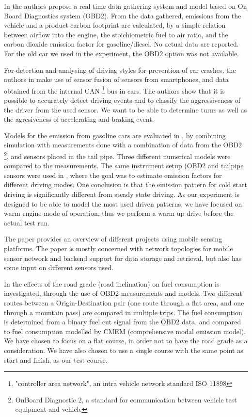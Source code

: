 \documentclass[conference]{IEEEtran}
\begin{document}
In \cite{hilpert201} the authors propose a real time data gathering system and model based on On Board Diagnostics system (OBD2). From the data gathered, emissions from the vehicle and a product carbon footprint are calculated, by a simple relation between airflow into the engine, the stoichiometric fuel to air ratio, and the carbon dioxide emission factor for gasoline/diesel. No actual data are reported. For the old car we used in the experiment, the OBD2 option was not available. 

For detection and analysing of driving styles for prevention of car crashes, the authors in \cite{Johnson2011} make use of sensor fusion of sensors from smartphones, and data obtained from the internal CAN \footnote{"controller area network", an intra vehicle network standard ISO 11898} bus in cars. The authors show that it is possible to accurately detect driving events and to classify the aggressiveness of the driver from the used sensor. We want to be able to determine turns as well as the agresiveness of accelerating and braking event.

Models for the emission from gasoline cars are evaluated in \cite{Silva2006}, by combining simulation with measurements done with a combination of data from the OBD2 \footnote{OnBoard Diagnostic 2, a standard for communication between vehicle test equipment and vehicle}, and sensors placed in the tail pipe. Three different numerical models were compared to the measurements. The same instrument setup (OBD2 and tailpipe sensors were used in \cite{Frey}, where the goal was to estimate emission factors for different driving modes. One conclusion is that the emission pattern for cold start driving is significantly different from steady state driving. As our experiment is designed to be able to model the most used driven patterns, we have focused on warm engine mode of operation, thus we perform a warm up drive before the actual test run.

The paper \cite{Lee2010} provides an overview of different projects using mobile sensing platforms. The paper is mostly concerned with network topologies for mobile sensor network and backend support for data storage and retrieval, but also has some input on different sensors used.

In \cite{Boriboon} the effects of the road grade (road inclination) on fuel consumption is investigated, through the use of OBD2 measurements and models. Two different routes between a Origin-Destination pair (one route through a flat area, and one through a mountain pass) are compared in multiple trips. The fuel consumption is determined from a binary fuel cut signal from the OBD2 data, and compared to fuel consumption modelled by CMEM (comprehensive modal emission model). We have chosen to focus on a flat course, in order not to have the road grade as a consideration. We have also chosen to use a single course with the same point as start and finish, as our test course.
\end{document}
